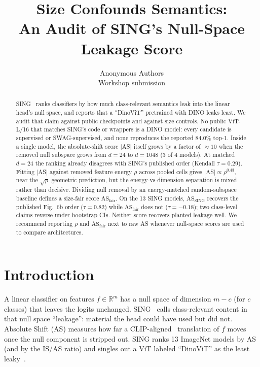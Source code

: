 \documentclass[10pt,twocolumn]{article}
\title{\vspace{-0.6em}Size Confounds Semantics:\\
An Audit of SING's Null-Space Leakage Score\vspace{-0.4em}}
\author{
Anonymous Authors\\
Workshop submission
}
\date{}
\begin{document}
\maketitle
\vspace{-1.2em}

\begin{abstract}
\vspace{-0.3em}
SING~\citep{sing2026} ranks classifiers by how much class-relevant semantics leak into the linear head's null space, and reports that a ``DinoViT'' pretrained with DINO leaks least.
We audit that claim against public checkpoints and against size controls.
No public ViT-L/16 that matches SING's code or wrappers is a DINO model: every candidate is supervised or SWAG-supervised, and none reproduces the reported 84.0\% top-1.
Inside a single model, the absolute-shift score $|$AS$|$ itself grows by a factor of $\approx\!10$ when the removed null subspace grows from $d{=}24$ to $d{=}1048$ (3 of 4 models). At matched $d{=}24$ the ranking already disagrees with SING's published order (Kendall $\tau{=}0.29$).
Fitting $|$AS$|$ against removed feature energy $\rho$ across pooled cells gives $|$AS$| \propto \rho^{0.43}$, near the $\sqrt{\rho}$ geometric prediction, but the energy-vs-dimension separation is mixed rather than decisive.
Dividing null removal by an energy-matched random-subspace baseline defines a size-fair score $\mathrm{AS}_{\mathrm{fair}}$.
On the 13 SING models, $\mathrm{AS}_{\mathrm{SING}}$ recovers the published Fig.~6b order ($\tau{=}0.82$) while $\mathrm{AS}_{\mathrm{fair}}$ does not ($\tau{=}{-}0.18$); two class-level claims reverse under bootstrap CIs.
Neither score recovers planted leakage well.
We recommend reporting $\rho$ and $\mathrm{AS}_{\mathrm{fair}}$ next to raw AS whenever null-space scores are used to compare architectures.
\vspace{-0.3em}
\end{abstract}

\section{Introduction}
\vspace{-0.2em}
A linear classifier on features $f\in\mathbb{R}^m$ has a null space of dimension $m{-}c$ (for $c$ classes) that leaves the logits unchanged.
SING~\citep{sing2026} calls class-relevant content in that null space ``leakage'': material the head could have used but did not.
Absolute Shift (AS) measures how far a CLIP-aligned~\citep{clip2021} translation of $f$ moves once the null component is stripped out. SING ranks 13 ImageNet models by AS (and by the IS/AS ratio) and singles out a ViT labeled ``DinoViT'' as the least leaky~\citep{dino2021}.
\end{document}
